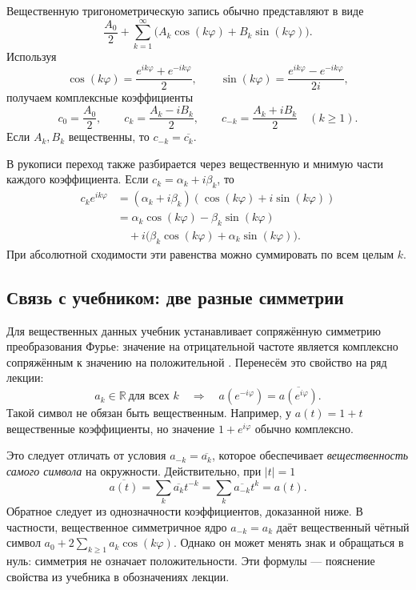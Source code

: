 \documentclass[12pt,a4paper]{article}
\theoremstyle{definition}
\theoremstyle{remark}
\newcommand{\RR}{\mathbb{R}}
\begin{document}
Вещественную тригонометрическую запись обычно представляют в виде
\[
  \frac{A_0}{2}+\sum_{k=1}^{\infty}
    \bigl(A_k\cos(k\varphi)+B_k\sin(k\varphi)\bigr).
\]
Используя
\[
  \cos(k\varphi)=\frac{e^{ik\varphi}+e^{-ik\varphi}}2,
  \qquad
  \sin(k\varphi)=\frac{e^{ik\varphi}-e^{-ik\varphi}}{2i},
\]
получаем комплексные коэффициенты
\[
  c_0=\frac{A_0}{2},\qquad
  c_k=\frac{A_k-iB_k}{2},\qquad
  c_{-k}=\frac{A_k+iB_k}{2}\quad(k\geqslant1).
\]
Если $A_k,B_k$ вещественны, то $c_{-k}=\overline{c_k}$.

В рукописи переход также разбирается через вещественную и мнимую
части каждого коэффициента. Если $c_k=\alpha_k+i\beta_k$, то
\begin{align*}
  c_ke^{ik\varphi}
  &=(\alpha_k+i\beta_k)(\cos(k\varphi)+i\sin(k\varphi))\\
  &=\alpha_k\cos(k\varphi)-\beta_k\sin(k\varphi)\\
  &\quad+i\bigl(\beta_k\cos(k\varphi)+\alpha_k\sin(k\varphi)\bigr).
\end{align*}
При абсолютной сходимости эти равенства можно суммировать по всем
целым $k$.

\subsection{Связь с учебником: две разные симметрии}

Для вещественных данных учебник устанавливает сопряжённую симметрию
преобразования Фурье: значение на отрицательной частоте является
комплексно сопряжённым к значению на положительной
\cite[\S\,4.6.4, с.~290--292]{GW2012}.
Перенесём это свойство на ряд лекции:
\[
  a_k\in\RR\ \text{для всех }k
  \quad\Longrightarrow\quad
  a(e^{-i\varphi})=\overline{a(e^{i\varphi})}.
\]
Такой символ не обязан быть вещественным. Например,
у $a(t)=1+t$ вещественные коэффициенты, но значение
$1+e^{i\varphi}$ обычно комплексно.

Это следует отличать от условия $a_{-k}=\overline{a_k}$,
которое обеспечивает \emph{вещественность самого символа}
на окружности. Действительно, при $|t|=1$
\[
  \overline{a(t)}
  =\sum_k\overline{a_k}t^{-k}
  =\sum_k\overline{a_{-k}}t^k=a(t).
\]
Обратное следует из однозначности коэффициентов, доказанной ниже.
В частности, вещественное симметричное ядро $a_{-k}=a_k$
даёт вещественный чётный символ
$a_0+2\sum_{k\geqslant1}a_k\cos(k\varphi)$.
Однако он может менять знак и обращаться в нуль: симметрия
не означает положительности. Эти формулы --- пояснение
свойства из учебника в обозначениях лекции.
\end{document}

